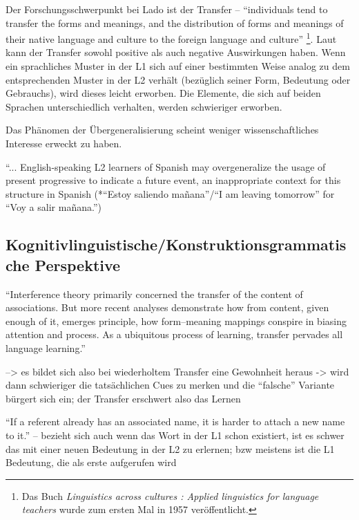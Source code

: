 Der Forschungsschwerpunkt bei Lado ist der Transfer --
``individuals tend to transfer the forms and meanings, and the distribution of forms and meanings of their native language and culture to the foreign language and culture''\cite{Lado71}
\footnote{Das Buch \textit{Linguistics across cultures : Applied linguistics
for language teachers} wurde zum ersten Mal in 1957 veröffentlicht.}.
Laut \cite{Lado71} kann der Transfer sowohl positive als auch negative Auswirkungen haben.
Wenn ein sprachliches Muster in der L1 sich auf einer bestimmten Weise analog zu dem entsprechenden Muster in der L2 verhält (bezüglich seiner Form, Bedeutung oder Gebrauchs), wird dieses leicht erworben.
Die Elemente, die sich auf beiden Sprachen unterschiedlich verhalten, werden schwieriger erworben.

Das Phänomen der Übergeneralisierung scheint weniger wissenschaftliches Interesse erweckt zu haben.



\cite{Braidi99}
``... English-speaking L2 learners of Spanish may overgeneralize the usage of present progressive to indicate a
future event, an inappropriate context for this structure in Spanish (*``Estoy saliendo mañana''/``I am leaving tomorrow''
for ``Voy a salir mañana.'')


\subsection{Kognitivlinguistische/Konstruktionsgrammatische Perspektive}

\cite{Ellis06} ``Interference theory primarily concerned the transfer of the content of
associations. But more recent analyses demonstrate how from content, given
enough of it, emerges principle, how form–meaning mappings conspire in
biasing attention and process. As a ubiquitous process of learning, transfer
pervades all language learning.''

--> es bildet sich also bei wiederholtem Transfer eine Gewohnheit heraus -> wird dann schwieriger die tatsächlichen Cues zu merken und die ``falsche'' Variante bürgert sich ein;
der Transfer erschwert also das Lernen

``If a referent already has an associated name, it is harder to
attach a new name to it.''
-- bezieht sich auch wenn das Wort in der L1 schon existiert, ist es schwer das mit einer neuen Bedeutung in der L2 zu erlernen; bzw meistens ist die L1 Bedeutung, die als erste aufgerufen wird

